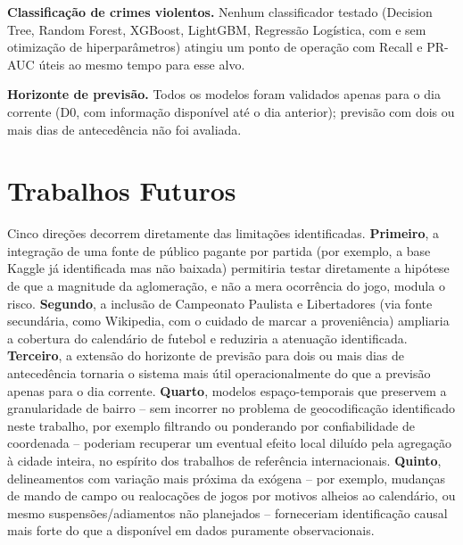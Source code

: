 \documentclass[12pt]{article}
\begin{document}
\textbf{Classificação de crimes violentos.} Nenhum classificador testado
(Decision Tree, Random Forest, XGBoost, LightGBM, Regressão Logística,
com e sem otimização de hiperparâmetros) atingiu um ponto de operação com
Recall e PR-AUC úteis ao mesmo tempo para esse alvo.

\textbf{Horizonte de previsão.} Todos os modelos foram validados apenas
para o dia corrente (D0, com informação disponível até o dia anterior);
previsão com dois ou mais dias de antecedência não foi avaliada.

\section{Trabalhos Futuros}

Cinco direções decorrem diretamente das limitações identificadas.
\textbf{Primeiro}, a integração de uma fonte de público pagante por
partida (por exemplo, a base Kaggle já identificada mas não baixada)
permitiria testar diretamente a hipótese de que a magnitude da
aglomeração, e não a mera ocorrência do jogo, modula o risco.
\textbf{Segundo}, a inclusão de Campeonato Paulista e Libertadores (via
fonte secundária, como Wikipedia, com o cuidado de marcar a proveniência)
ampliaria a cobertura do calendário de futebol e reduziria a atenuação
identificada. \textbf{Terceiro}, a extensão do horizonte de previsão para
dois ou mais dias de antecedência tornaria o sistema mais útil
operacionalmente do que a previsão apenas para o dia corrente.
\textbf{Quarto}, modelos espaço-temporais que preservem a granularidade
de bairro -- sem incorrer no problema de geocodificação identificado
neste trabalho, por exemplo filtrando ou ponderando por confiabilidade de
coordenada -- poderiam recuperar um eventual efeito local diluído pela
agregação à cidade inteira, no espírito dos trabalhos de referência
internacionais. \textbf{Quinto}, delineamentos com variação mais próxima
da exógena -- por exemplo, mudanças de mando de campo ou realocações de
jogos por motivos alheios ao calendário, ou mesmo suspensões/adiamentos
não planejados -- forneceriam identificação causal mais forte do que a
disponível em dados puramente observacionais.
\end{document}
